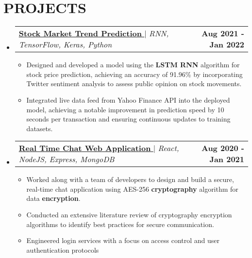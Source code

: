 \documentclass[letterpaper,10pt]{article}
\makeatletter
\newcommand{\resumeItem}[1]{
  \item\small{
    {#1 \vspace{-2pt}}
  }
}
\newcommand{\resumeProjectHeading}[2]{
    \item
    \begin{tabular*}{1.001\textwidth}{l@{\extracolsep{\fill}}r}
      \small#1 & \textbf{\small #2}\\
    \end{tabular*}\vspace{-7pt}
}
\newcommand{\resumeSubHeadingListStart}{\begin{itemize}[leftmargin=0.0in, label={}]}
\newcommand{\resumeSubHeadingListEnd}{\end{itemize}}
\newcommand{\resumeItemListStart}{\begin{itemize}}
\newcommand{\resumeItemListEnd}{\end{itemize}\vspace{-5pt}}
\makeatother
\begin{document}
\section{PROJECTS}
\resumeSubHeadingListStart   
  \resumeProjectHeading {\href{https://www.springerprofessional.de/en/stock-market-trend-prediction-along-with-twitter-sentiment-analy/24659292}{\textbf{\large{Stock Market Trend Prediction}} \href{https://www.springerprofessional.de/en/stock-market-trend-prediction-along-with-twitter-sentiment-analy/24659292}{\raisebox{-0.1\height}\faExternalLink }} $|$ \textit{\normalsize{RNN, TensorFlow, Keras, Python}}}{Aug 2021 - Jan 2022}
  \resumeItemListStart
    \resumeItem{\normalsize{Designed and developed a model using the \textbf{LSTM RNN} algorithm for stock price prediction, achieving an accuracy of 91.96\% by incorporating Twitter sentiment analysis to assess
public opinion on stock movements.}}
    \resumeItem{\normalsize{Integrated live data feed from Yahoo Finance API into the deployed model, achieving a notable improvement in prediction speed by 10 seconds per transaction and ensuring continuous updates to training datasets.}}
  \resumeItemListEnd
  \vspace{-12pt}
  \resumeProjectHeading {\href{https://www.ijraset.com/fileserve.php?FID=35305}{\textbf{\large{Real Time Chat Web Application}} \href{https://www.ijraset.com/fileserve.php?FID=35305}{\raisebox{-0.1\height}\faExternalLink }} $|$ \textit{\normalsize{React, NodeJS, Express, MongoDB}}}{Aug 2020 - Jan 2021}
  \resumeItemListStart
    \resumeItem{\normalsize{Worked along with a team of developers to design and build a secure, real-time chat application using AES-256 \textbf{cryptography} algorithm for data \textbf{encryption}.}}
    \resumeItem{\normalsize{Conducted an extensive literature review of cryptography encryption algorithms to identify best practices for secure communication.}}
    \resumeItem{\normalsize{Engineered login services with a focus on access control and user authentication protocols}}
  \resumeItemListEnd
\resumeSubHeadingListEnd
\vspace{-12pt}
\end{document}
